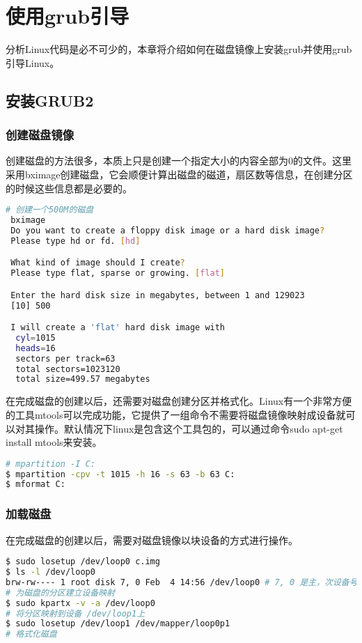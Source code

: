 \chapter{使用grub引导}
分析Linux代码是必不可少的，本章将介绍如何在磁盘镜像上安装grub并使用grub引导Linux。
\section{安装GRUB2}
\subsection{创建磁盘镜像}
创建磁盘的方法很多，本质上只是创建一个指定大小的内容全部为0的文件。这里采用bximage创建磁盘，它会顺便计算出磁盘的磁道，扇区数等信息，在创建分区的时候这些信息都是必要的。

\begin{lstlisting}[language=bash]
# 创建一个500M的磁盘
 bximage
 Do you want to create a floppy disk image or a hard disk image?
 Please type hd or fd. [hd] 

 What kind of image should I create?
 Please type flat, sparse or growing. [flat]

 Enter the hard disk size in megabytes, between 1 and 129023
 [10] 500

 I will create a 'flat' hard disk image with
  cyl=1015
  heads=16
  sectors per track=63
  total sectors=1023120
  total size=499.57 megabytes
\end{lstlisting}


在完成磁盘的创建以后，还需要对磁盘创建分区并格式化。Linux有一个非常方便的工具mtools可以完成功能，它提供了一组命令不需要将磁盘镜像映射成设备就可以对其操作。默认情况下linux是包含这个工具包的，可以通过命令sudo apt-get install mtools来安装。
\begin{lstlisting}[language=bash]
# mpartition -I C:
$ mpartition -cpv -t 1015 -h 16 -s 63 -b 63 C:
$ mformat C:
\end{lstlisting}

\subsection{加载磁盘}
在完成磁盘的创建以后，需要对磁盘镜像以块设备的方式进行操作。
\begin{lstlisting}[language=bash]
$ sudo losetup /dev/loop0 c.img
$ ls -l /dev/loop0
brw-rw---- 1 root disk 7, 0 Feb  4 14:56 /dev/loop0 # 7, 0 是主，次设备号
# 为磁盘的分区建立设备映射
$ sudo kpartx -v -a /dev/loop0
# 将分区映射到设备 /dev/loop1上
$ sudo losetup /dev/loop1 /dev/mapper/loop0p1
# 格式化磁盘
\end{lstlisting}


